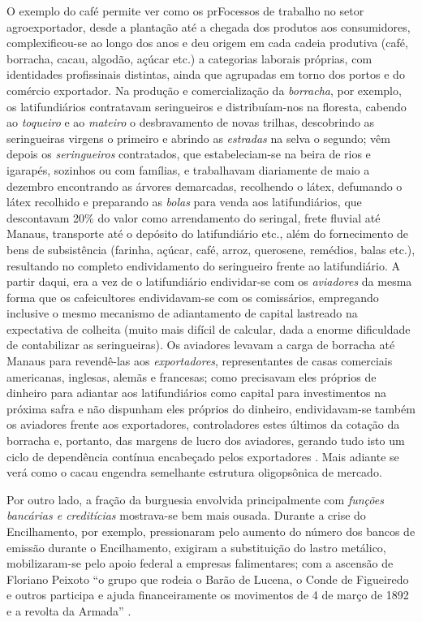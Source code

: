 O exemplo do café permite ver como os prFocessos de trabalho no setor agroexportador, desde a plantação até a chegada dos produtos aos consumidores, complexificou-se ao longo dos anos e deu origem em cada cadeia produtiva (café, borracha, cacau, algodão, açúcar etc.) a categorias laborais próprias, com identidades profissinais distintas, ainda que agrupadas em torno dos portos e do comércio exportador. Na produção e comercialização da \textit{borracha}, por exemplo, os latifundiários contratavam seringueiros e distribuíam-nos na floresta, cabendo ao \textit{toqueiro} e ao \textit{mateiro} o desbravamento de novas trilhas, descobrindo as seringueiras virgens o primeiro e abrindo as \textit{estradas} na selva o segundo; vêm depois os \textit{seringueiros} contratados, que estabeleciam-se na beira de rios e igarapés, sozinhos ou com famílias, e trabalhavam diariamente de maio a dezembro encontrando as árvores demarcadas, recolhendo o látex, defumando o látex recolhido e preparando as \textit{bolas} para venda aos latifundiários, que descontavam 20\% do valor como arrendamento do seringal, frete fluvial até Manaus, transporte até o depósito do latifundiário etc., além do fornecimento de bens de subsistência (farinha, açúcar, café, arroz, querosene, remédios, balas etc.), resultando no completo endividamento do seringueiro frente ao latifundiário. A partir daqui, era a vez de o latifundiário endividar-se com os \textit{aviadores} da mesma forma que os cafeicultores endividavam-se com os comissários, empregando inclusive o mesmo mecanismo de adiantamento de capital lastreado na expectativa de colheita (muito mais difícil de calcular, dada a enorme dificuldade de contabilizar as seringueiras). Os aviadores levavam a carga de borracha até Manaus para revendê-las aos \textit{exportadores}, representantes de casas comerciais americanas, inglesas, alemãs e francesas; como precisavam eles próprios de dinheiro para adiantar aos latifundiários como capital para investimentos na próxima safra e não dispunham eles próprios do dinheiro, endividavam-se também os aviadores frente aos exportadores, controladores estes últimos da cotação da borracha e, portanto, das margens de lucro dos aviadores, gerando tudo isto um ciclo de dependência contínua encabeçado pelos exportadores \cite[pp.~62-68]{CARONE1970inst}. Mais adiante se verá como o cacau engendra semelhante estrutura oligopsônica de mercado.

Por outro lado, a fração da burguesia envolvida principalmente com \textit{funções bancárias e creditícias} mostrava-se bem mais ousada. Durante a crise do Encilhamento, por exemplo, pressionaram pelo aumento do número dos bancos de emissão durante o Encilhamento, exigiram a substituição do lastro metálico, mobilizaram-se pelo apoio federal a empresas falimentares; com a ascensão de Floriano Peixoto ``o grupo que rodeia o Barão de Lucena, o Conde de Figueiredo e outros participa e ajuda financeiramente os movimentos de 4 de março de 1892 e a revolta da Armada'' \cite[pp.~158-159]{CARONE1970inst}.


